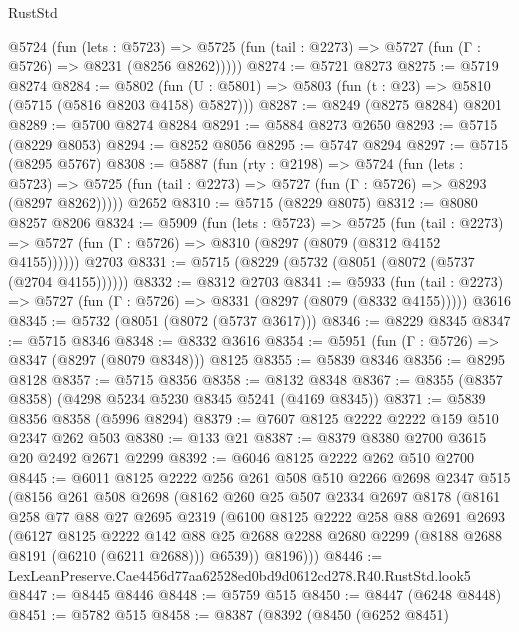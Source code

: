 \begin{lexlean}{RustStd}
\begin{coremodule}
    @5724
      (fun (lets : @5723) =>
      @5725 (fun (tail : @2273) => @5727 (fun (Γ : @5726) => @8231 (@8256 @8262)))))
@8274 := @5721 @8273
@8275 := @5719 @8274
@8284 := @5802 (fun (U : @5801) => @5803 (fun (t : @23) => @5810 (@5715 (@5816 @8203 @4158) @5827)))
@8287 := @8249 (@8275 @8284) @8201
@8289 := @5700 @8274 @8284
@8291 := @5884 @8273 @2650
@8293 := @5715 (@8229 @8053)
@8294 := @8252 @8056
@8295 := @5747 @8294
@8297 := @5715 (@8295 @5767)
@8308 := @5887
    (fun (rty : @2198) =>
    @5724
      (fun (lets : @5723) =>
      @5725 (fun (tail : @2273) => @5727 (fun (Γ : @5726) => @8293 (@8297 @8262)))))
    @2652
@8310 := @5715 (@8229 @8075)
@8312 := @8080 @8257 @8206
@8324 := @5909
    (fun (lets : @5723) =>
    @5725
      (fun (tail : @2273) => @5727 (fun (Γ : @5726) => @8310 (@8297 (@8079 (@8312 @4152 @4155))))))
    @2703
@8331 := @5715 (@8229 (@5732 (@8051 (@8072 (@5737 (@2704 @4155))))))
@8332 := @8312 @2703
@8341 := @5933
    (fun (tail : @2273) => @5727 (fun (Γ : @5726) => @8331 (@8297 (@8079 (@8332 @4155)))))
    @3616
@8345 := @5732 (@8051 (@8072 (@5737 @3617)))
@8346 := @8229 @8345
@8347 := @5715 @8346
@8348 := @8332 @3616
@8354 := @5951 (fun (Γ : @5726) => @8347 (@8297 (@8079 @8348))) @8125
@8355 := @5839 @8346
@8356 := @8295 @8128
@8357 := @5715 @8356
@8358 := @8132 @8348
@8367 := @8355 (@8357 @8358) (@4298 @5234 @5230 @8345 @5241 (@4169 @8345))
@8371 := @5839 @8356 @8358 (@5996 @8294)
@8379 := @7607 @8125 @2222 @2222 @159 @510 @2347 @262 @503
@8380 := @133 @21
@8387 := @8379 @8380 @2700 @3615 @20 @2492 @2671 @2299
@8392 := @6046 @8125 @2222 @262 @510 @2700
@8445 := @6011
    @8125
    @2222
    @256
    @261
    @508
    @510
    @2266
    @2698
    @2347
    @515
    (@8156
      @261
      @508
      @2698
      (@8162
        @260
        @25
        @507
        @2334
        @2697
        @8178
        (@8161
          @258
          @77
          @88
          @27
          @2695
          @2319
          (@6100
            @8125
            @2222
            @258
            @88
            @2691
            @2693
            (@6127
              @8125
              @2222
              @142
              @88
              @25
              @2688
              @2288
              @2680
              @2299
              (@8188 @2688 @8191 (@6210 (@6211 @2688)))
              @6539))
          @8196)))
@8446 := LexLeanPreserve.Cae4456d77aa62528ed0bd9d0612cd278.R40.RustStd.look5
@8447 := @8445 @8446
@8448 := @5759 @515
@8450 := @8447 (@6248 @8448)
@8451 := @5782 @515
@8458 := @8387
    (@8392
      (@8450
        (@6252 @8451)

\end{coremodule}
\end{lexlean}
